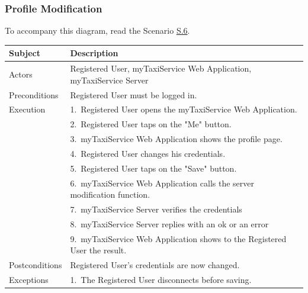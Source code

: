 \subsubsection{Profile Modification}
			To accompany this diagram, read the Scenario \hyperref[sec:RegisteredUserProfileModificationScenario]{S.6}.

				\begin{table}[htpb]
					\centering
					\label{tab:RegisteredUserProfileModificationDiagramTable}
					\begin{tabularx}{\textwidth}{lp{9cm}}
						\hline
						\hline
							\textbf{Subject}
						& 
							\textbf{Description}\\
						\hline
							Actors	       &  Registered User, myTaxiService Web Application, myTaxiService Server\\
						\hline
							Preconditions  &  Registered User must be logged in.\\
						\hline
							Execution      &  1.~Registered User opens the myTaxiService Web Application.\\
										   &  2.~Registered User taps on the "Me" button.\\
										   &  3.~myTaxiService Web Application shows the profile page.\\
										   &  4.~Registered User changes his credentials.\\
										   &  5.~Registered User taps on the "Save" button.\\
										   &  6.~myTaxiService Web Application calls the server modification function.\\
										   &  7.~myTaxiService Server verifies the credentials\\
										   &  8.~myTaxiService Server replies with an ok or an error\\
										   &  9.~myTaxiService Web Application shows to the Registered User the result.\\
						\hline
							Postconditions &  Registered User's credentials are now changed.\\
						\hline
							Exceptions     &  1.~The Registered User disconnects before saving.\\
									
						\hline
						\hline
					\end{tabularx}
				\end{table}
				

